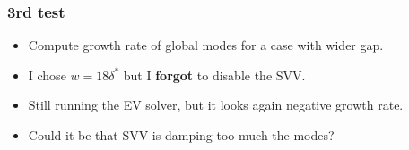 \documentclass[
	aspectratio=169, %
	t, %
	onlytextwidth, %
	10pt, %
]{beamer}
\begin{document}
\begin{frame}
	\frametitle{3rd test}
	\begin{itemize}
		\item Compute growth rate of global modes for a case with wider gap. 
		\item I chose $w = 18\delta^*$ but I \textbf{forgot} to disable the SVV.
		\item Still running the EV solver, but it looks again negative growth rate.
		\item Could it be that SVV is damping too much the modes?
	\end{itemize}
	
\end{frame}
\end{document}
